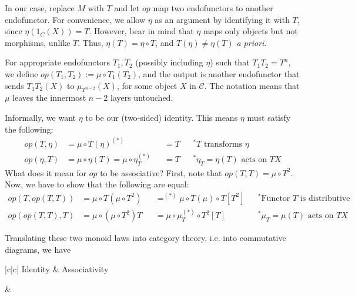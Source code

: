 \documentclass[11pt]{article}
\newcommand{\Cc}{\mathcal{C}}
\begin{document}
In our case, replace $M$ with $T$ and let $\mathit{op}$ map two endofunctors to another endofunctor. For convenience, we allow $\eta$ as an argument by identifying it with $T$, since $\eta(1_C(X)) = T$. However, bear in mind that $\eta$ maps only objects but not morphisms, unlike $T$. Thus, $\eta(T) = \eta \circ T$, and $T(\eta) \neq \eta(T)$ \textit{a priori}.

For appropriate endofunctors $T_1, T_2$ (possibly including $\eta$) such that $T_1T_2 = T^n$, we define $\mathit{op}(T_1, T_2) := \mu \circ T_1(T_2)$, and the output is another endofunctor that sends $T_1T_2(X)$ to $\mu_{T^{n-2}}(X)$, for some object $X$ in $\Cc$. The notation means that $\mu$ leaves the innermost $n-2$ layers untouched.

Informally, we want $\eta$ to be our (two-sided) identity. This means $\eta$ must satisfy the following:
\begin{align*}
    \mathit{op}(T, \eta) &= \mu \circ T(\eta)^{(*)} &&= T && \text{$^* T$ transforms $\eta$}\\
    \mathit{op}(\eta, T) &= \mu \circ \eta(T) = \mu \circ \eta_T^{(*)} &&= T && \text{$^* \eta_T = \eta(T)$ acts on $TX$} 
\end{align*}
What does it mean for $op$ to be associative? First, note that $\mathit{op}(T, T) = \mu \circ T^2$. Now, we have to show that the following are equal:
\begin{align*}
    \mathit{op}(T, \mathit{op}(T, T)) &= \mu \circ T(\mu \circ T^2) &&=^{(*)} \mu \circ T(\mu) \circ T[T^2] && \text{$^*$Functor $T$ is distributive}\\
    \mathit{op}(\mathit{op}(T, T), T) &= \mu \circ (\mu \circ T^2) T &&= \mu \circ \mu_T^{(*)} \circ T^2[T] && \text{$^* \mu_T = \mu(T)$ acts on $TX$}
\end{align*}

Translating these two monoid laws into category theory, i.e. into commutative diagrams, we have

\begin{center}
\begin{tabular}{|c|c|}
    \hline
    Identity & Associativity \\ \hline
    &
     \\ \hline
\end{tabular}    
\end{center}
\end{document}
